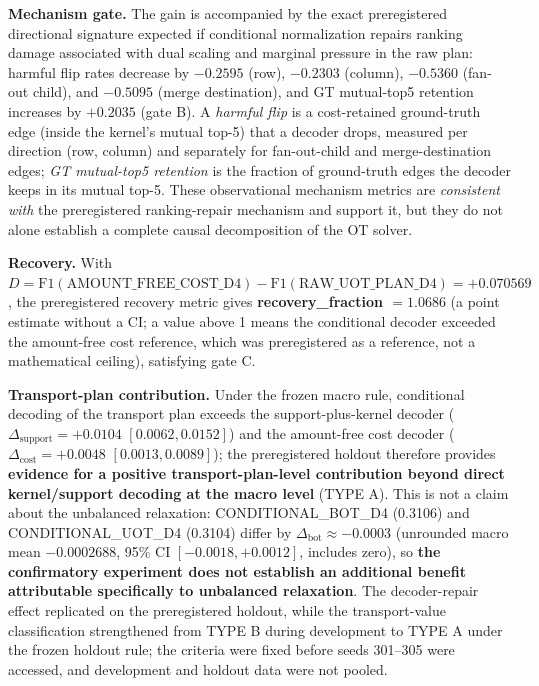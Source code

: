 \textbf{Mechanism gate.} The gain is accompanied by the exact preregistered directional signature expected if conditional normalization repairs ranking damage associated with dual scaling and marginal pressure in the raw plan: harmful flip rates decrease by $-0.2595$ (row), $-0.2303$ (column), $-0.5360$ (fan-out child), and $-0.5095$ (merge destination), and GT mutual-top5 retention increases by $+0.2035$ (gate B). A \emph{harmful flip} is a cost-retained ground-truth edge (inside the kernel's mutual top-5) that a decoder drops, measured per direction (row, column) and separately for fan-out-child and merge-destination edges; \emph{GT mutual-top5 retention} is the fraction of ground-truth edges the decoder keeps in its mutual top-5. These observational mechanism metrics are \emph{consistent with} the preregistered ranking-repair mechanism and support it, but they do not alone establish a complete causal decomposition of the OT solver.

\textbf{Recovery.} With $D = \mathrm{F1}(\mathrm{AMOUNT\_FREE\_COST\_D4}) - \mathrm{F1}(\mathrm{RAW\_UOT\_PLAN\_D4}) = +0.070569$, the preregistered recovery metric gives \textbf{recovery\_fraction $= 1.0686$} (a point estimate without a CI; a value above 1 means the conditional decoder exceeded the amount-free cost reference, which was preregistered as a reference, not a mathematical ceiling), satisfying gate C.

\textbf{Transport-plan contribution.} Under the frozen macro rule, conditional decoding of the transport plan exceeds the support-plus-kernel decoder ($\Delta_{\mathrm{support}} = +0.0104$ $[0.0062, 0.0152]$) and the amount-free cost decoder ($\Delta_{\mathrm{cost}} = +0.0048$ $[0.0013, 0.0089]$); the preregistered holdout therefore provides \textbf{evidence for a positive transport-plan-level contribution beyond direct kernel/support decoding at the macro level} (TYPE A). This is not a claim about the unbalanced relaxation: CONDITIONAL\_BOT\_D4 (0.3106) and CONDITIONAL\_UOT\_D4 (0.3104) differ by $\Delta_{\mathrm{bot}} \approx -0.0003$ (unrounded macro mean $-0.0002688$, 95\% CI $[-0.0018, +0.0012]$, includes zero), so \textbf{the confirmatory experiment does not establish an additional benefit attributable specifically to unbalanced relaxation}. The decoder-repair effect replicated on the preregistered holdout, while the transport-value classification strengthened from TYPE B during development to TYPE A under the frozen holdout rule; the criteria were fixed before seeds 301--305 were accessed, and development and holdout data were not pooled.

